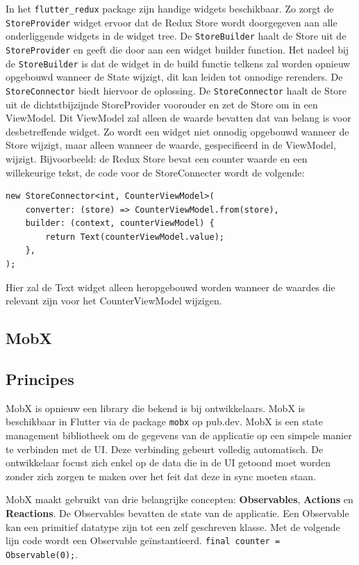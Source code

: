 In het \verb|flutter_redux| package zijn handige widgets beschikbaar. Zo zorgt de \verb|StoreProvider| widget ervoor dat de Redux Store wordt doorgegeven aan alle onderliggende widgets in de widget tree. De \verb|StoreBuilder| haalt de Store uit de \verb|StoreProvider| en geeft die door aan een widget builder function. Het nadeel bij de \verb|StoreBuilder| is dat de widget in de build functie telkens zal worden opnieuw opgebouwd wanneer de State wijzigt, dit kan leiden tot onnodige rerenders. De \verb|StoreConnector| biedt hiervoor de oplossing. De \verb|StoreConnector| haalt de Store uit de dichtstbijzijnde StoreProvider voorouder en zet de Store om in een ViewModel. Dit ViewModel zal alleen de waarde bevatten dat van belang is voor desbetreffende widget. Zo wordt een widget niet onnodig opgebouwd wanneer de Store wijzigt, maar alleen wanneer de waarde, gespecifieerd in de ViewModel, wijzigt. Bijvoorbeeld: de Redux Store bevat een counter waarde en een willekeurige tekst, de code voor de StoreConnecter wordt de volgende: 

\begin{verbatim}
new StoreConnector<int, CounterViewModel>(
    converter: (store) => CounterViewModel.from(store),
    builder: (context, counterViewModel) {
        return Text(counterViewModel.value);
    },
);
\end{verbatim}
Hier zal de Text widget alleen heropgebouwd worden wanneer de waardes die relevant zijn voor het CounterViewModel wijzigen.


\subsection{MobX}
\label{ch:mobx}
\subsection*{Principes}
MobX is opnieuw een library die bekend is bij ontwikkelaars. MobX is beschikbaar in Flutter via de package \verb|mobx| op pub.dev. MobX is een state management bibliotheek om de gegevens van de applicatie op een simpele manier te verbinden met de UI. Deze verbinding gebeurt volledig automatisch. De ontwikkelaar focust zich enkel op de data die in de UI getoond moet worden zonder zich zorgen te maken over het feit dat deze in sync moeten staan.

MobX maakt gebruikt van drie belangrijke concepten: \textbf{Observables}, \textbf{Actions} en \textbf{Reactions}.
\newline
De Observables bevatten de state van de applicatie. Een Observable kan een primitief datatype zijn tot een zelf geschreven klasse. Met de volgende lijn code wordt een Observable geïnstantieerd. \verb|final counter = Observable(0);|.

